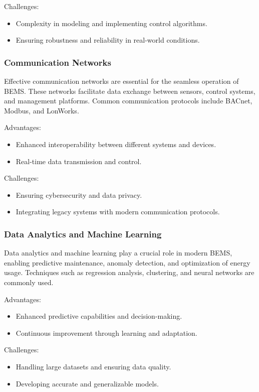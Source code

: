 Challenges:
\begin{itemize}
    \item Complexity in modeling and implementing control algorithms.
    \item Ensuring robustness and reliability in real-world conditions.
\end{itemize}

\subsubsection*{Communication Networks}

Effective communication networks are essential for the seamless operation of BEMS. These networks facilitate data exchange between sensors, control systems, and management platforms. Common communication protocols include BACnet, Modbus, and LonWorks.

Advantages:
\begin{itemize}
    \item Enhanced interoperability between different systems and devices.
    \item Real-time data transmission and control.
\end{itemize}

Challenges:
\begin{itemize}
    \item Ensuring cybersecurity and data privacy.
    \item Integrating legacy systems with modern communication protocols.
\end{itemize}

\subsubsection*{Data Analytics and Machine Learning}

Data analytics and machine learning play a crucial role in modern BEMS, enabling predictive maintenance, anomaly detection, and optimization of energy usage. Techniques such as regression analysis, clustering, and neural networks are commonly used.

Advantages:
\begin{itemize}
    \item Enhanced predictive capabilities and decision-making.
    \item Continuous improvement through learning and adaptation.
\end{itemize}

Challenges:
\begin{itemize}
    \item Handling large datasets and ensuring data quality.
    \item Developing accurate and generalizable models.
\end{itemize}


